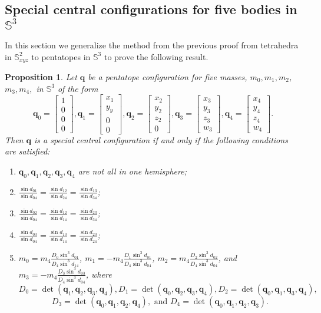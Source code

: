 \documentclass[12pt]{amsart}
\newtheorem{proposition}{Proposition}
\theoremstyle{definition}
\def \mb{\mathbb}
\def \S{\mb S}        %
\newcommand {\q} {\mathbf{q}}
\begin{document}
{%
\subsection{Special central configurations for five bodies in $\S^3$}

In this section we generalize the method from the previous proof from tetrahedra in $\S^2_{xyz}$ to pentatopes in $\S^3$ to prove the following result.
\begin{proposition} Let $\q$ be a pentatope configuration for five masses, $m_0, m_1, m_2$, $m_3, m_4,$ in $\S^3$ of the form 
$$\q_0=\begin{bmatrix}1\\0\\0\\0\end{bmatrix}, \q_1=\begin{bmatrix}x_1\\y_y\\0\\0\end{bmatrix}, \q_2=\begin{bmatrix}x_2\\y_2\\z_2\\0\end{bmatrix}, \q_3=\begin{bmatrix}x_3\\y_3\\z_3\\w_3\end{bmatrix}, \q_4=\begin{bmatrix}x_4\\y_4\\z_4\\w_4\end{bmatrix}.$$ 
Then $\q$ is a special central configuration if and only if the following conditions are satisfied:
\begin{enumerate}
\item $\q_0, \q_1, \q_2, \q_3, \q_4$ are not all in one hemisphere;
\item $\frac{\sin{d_{01}}}{\sin{d_{04}}}=\frac{\sin{d_{12}}}{\sin{d_{24}}}=\frac{\sin{d_{13}}}{\sin{d_{34}}}$;
\item $\frac{\sin{d_{02}}}{\sin{d_{04}}}=\frac{\sin{d_{12}}}{\sin{d_{14}}}=\frac{\sin{d_{23}}}{\sin{d_{34}}}$;
\item $\frac{\sin{d_{03}}}{\sin{d_{04}}}=\frac{\sin{d_{13}}}{\sin{d_{14}}}=\frac{\sin{d_{23}}}{\sin{d_{24}}}$;
\item $m_0=m_4\frac{D_0\sin^3{d_{01}}}{D_4\sin^3{d_{14}}}$, $m_1=-m_4\frac{D_1\sin^3{d_{01}}}{D_4\sin^3{d_{04}}}$, $m_2=m_4\frac{D_2\sin^3{d_{02}}}{D_4\sin^3{d_{04}}}$, and $m_3=-m_4\frac{D_3\sin^3{d_{03}}}{D_4\sin^3{d_{04}}}$, where $$D_0=\det(\q_1,\q_2,\q_3,\q_4), D_1=\det(\q_0,\q_2,\q_3,\q_4), D_2=\det(\q_0, \q_1, \q_3, \q_4),$$  $$D_3=\det(\q_0, \q_1, \q_2, \q_4),\text{ and }D_4=\det(\q_0, \q_1, \q_2, \q_3).$$

\end{enumerate}
\end{proposition}}
\end{document}
